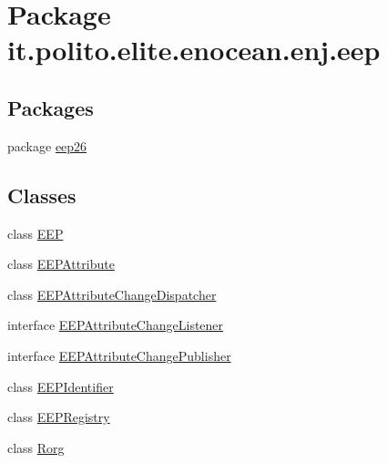 \hypertarget{namespaceit_1_1polito_1_1elite_1_1enocean_1_1enj_1_1eep}{}\section{Package it.\+polito.\+elite.\+enocean.\+enj.\+eep}
\label{namespaceit_1_1polito_1_1elite_1_1enocean_1_1enj_1_1eep}
\subsection*{Packages}
\begin{DoxyCompactItemize}
\item 
package \hyperlink{namespaceit_1_1polito_1_1elite_1_1enocean_1_1enj_1_1eep_1_1eep26}{eep26}
\end{DoxyCompactItemize}
\subsection*{Classes}
\begin{DoxyCompactItemize}
\item 
class \hyperlink{classit_1_1polito_1_1elite_1_1enocean_1_1enj_1_1eep_1_1_e_e_p}{E\+EP}
\item 
class \hyperlink{classit_1_1polito_1_1elite_1_1enocean_1_1enj_1_1eep_1_1_e_e_p_attribute}{E\+E\+P\+Attribute}
\item 
class \hyperlink{classit_1_1polito_1_1elite_1_1enocean_1_1enj_1_1eep_1_1_e_e_p_attribute_change_dispatcher}{E\+E\+P\+Attribute\+Change\+Dispatcher}
\item 
interface \hyperlink{interfaceit_1_1polito_1_1elite_1_1enocean_1_1enj_1_1eep_1_1_e_e_p_attribute_change_listener}{E\+E\+P\+Attribute\+Change\+Listener}
\item 
interface \hyperlink{interfaceit_1_1polito_1_1elite_1_1enocean_1_1enj_1_1eep_1_1_e_e_p_attribute_change_publisher}{E\+E\+P\+Attribute\+Change\+Publisher}
\item 
class \hyperlink{classit_1_1polito_1_1elite_1_1enocean_1_1enj_1_1eep_1_1_e_e_p_identifier}{E\+E\+P\+Identifier}
\item 
class \hyperlink{classit_1_1polito_1_1elite_1_1enocean_1_1enj_1_1eep_1_1_e_e_p_registry}{E\+E\+P\+Registry}
\item 
class \hyperlink{classit_1_1polito_1_1elite_1_1enocean_1_1enj_1_1eep_1_1_rorg}{Rorg}
\end{DoxyCompactItemize}
